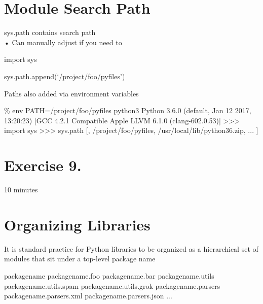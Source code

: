 \documentclass[
  letterpaper,
  DIV=11,
  numbers=noendperiod]{scrreprt}
\newenvironment{Shaded}{\begin{snugshade}}{\end{snugshade}}
\newcommand{\NormalTok}[1]{\textcolor[rgb]{0.00,0.23,0.31}{#1}}
\begin{document}

\chapter{Module Search Path}\label{module-search-path-1}

sys.path contains search path\\
• Can manually adjust if you need to

import sys

sys.path.append(`/project/foo/pyfiles')

Paths also added via environment variables

\begin{Shaded}
\begin{Highlighting}[]
\NormalTok{\% env PATH=/project/foo/pyfiles python3   }
\NormalTok{Python 3.6.0 (default, Jan 12 2017, 13:20:23)   }
\NormalTok{[GCC 4.2.1 Compatible Apple LLVM 6.1.0 (clang{-}602.0.53)]   }
\NormalTok{\textgreater{}\textgreater{}\textgreater{} import sys   }
\NormalTok{\textgreater{}\textgreater{}\textgreater{} sys.path   }
\NormalTok{[\textquotesingle{}\textquotesingle{}, \textquotesingle{}/project/foo/pyfiles\textquotesingle{}, \textquotesingle{}/usr/local/lib/python36.zip\textquotesingle{}, ... ] }
\end{Highlighting}
\end{Shaded}


\chapter{Exercise 9.}\label{exercise-9.}

10 minutes


\chapter{Organizing Libraries}\label{organizing-libraries}

It is standard practice for Python libraries to be organized as a
hierarchical set of modules that sit under a top-level package name

\begin{Shaded}
\begin{Highlighting}[]
\NormalTok{packagename  }
\NormalTok{packagename.foo  }
\NormalTok{packagename.bar  }
\NormalTok{packagename.utils  }
\NormalTok{packagename.utils.spam  }
\NormalTok{packagename.utils.grok  }
\NormalTok{packagename.parsers  }
\NormalTok{packagename.parsers.xml  }
\NormalTok{packagename.parsers.json  }
\NormalTok{... }
\end{Highlighting}
\end{Shaded}
\end{document}
